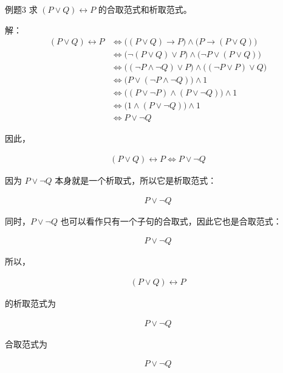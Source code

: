 \begin{question}{例题3}
	求 $(P \lor Q)\leftrightarrow P$ 的合取范式和析取范式。
	
	解：
	\begin{align*}
		(P \lor Q)\leftrightarrow P
		&\Leftrightarrow \big((P \lor Q)\to P\big)\land \big(P\to (P\lor Q)\big) \\
		&\Leftrightarrow \big(\neg(P\lor Q)\lor P\big)\land \big(\neg P\lor (P\lor Q)\big) \\
		&\Leftrightarrow \big((\neg P\land \neg Q)\lor P\big)\land \big((\neg P\lor P)\lor Q\big) \\
		&\Leftrightarrow \big(P\lor(\neg P\land \neg Q)\big)\land 1 \\
		&\Leftrightarrow \big((P\lor \neg P)\land (P\lor \neg Q)\big)\land 1 \\
		&\Leftrightarrow \big(1\land (P\lor \neg Q)\big)\land 1 \\
		&\Leftrightarrow P\lor \neg Q
	\end{align*}
	
	因此，
	
	\begin{align*}
		(P \lor Q)\leftrightarrow P \Leftrightarrow P\lor \neg Q
	\end{align*}
	
	因为 \(P\lor \neg Q\) 本身就是一个析取式，所以它是析取范式：
	
	\begin{align*}
		\boxed{P\lor \neg Q}
	\end{align*}
	
	同时，\(P\lor \neg Q\) 也可以看作只有一个子句的合取式，因此它也是合取范式：
	
	\begin{align*}
		\boxed{P\lor \neg Q}
	\end{align*}
	
	所以，
	
	\begin{align*}
		(P \lor Q)\leftrightarrow P
	\end{align*}
	
	的析取范式为
	
	\begin{align*}
		\boxed{P\lor \neg Q}
	\end{align*}
	
	合取范式为
	
	\begin{align*}
		\boxed{P\lor \neg Q}
	\end{align*}
	

\end{question}
